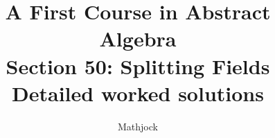 
\title{\textbf{A First Course in Abstract Algebra}\\[0.3em]Section 50: Splitting Fields\\[0.3em]\large Detailed worked solutions}
\author{Mathjock}
\date{}

\maketitle
\bookinfo
\tableofcontents
\clearpage
\renewcommand{\thesection}{50}
\renewcommand{\theHsection}{fraleigh.50}


